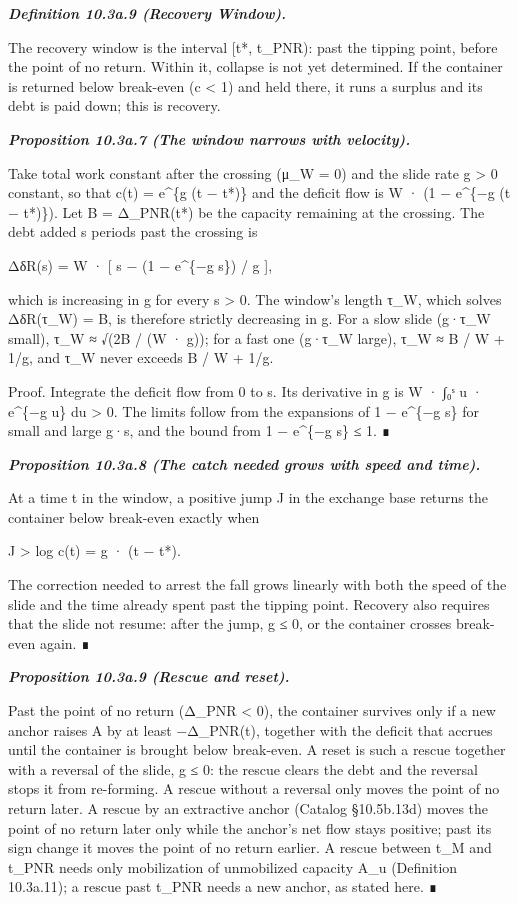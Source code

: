 \documentclass[
]{article}
\begin{document}
\emph{\textbf{Definition 10.3a.9 (Recovery Window).}}

The recovery window is the interval {[}t*, t\_PNR): past the tipping
point, before the point of no return. Within it, collapse is not yet
determined. If the container is returned below break-even (c \textless{}
1) and held there, it runs a surplus and its debt is paid down; this is
recovery.

\emph{\textbf{Proposition 10.3a.7 (The window narrows with velocity).}}

Take total work constant after the crossing (μ\_W = 0) and the slide
rate g \textgreater{} 0 constant, so that c(t) = e\^{}\{g (t − t*)\} and
the deficit flow is W · (1 − e\^{}\{−g (t − t*)\}). Let B = Δ\_PNR(t*)
be the capacity remaining at the crossing. The debt added s periods past
the crossing is

ΔδR(s) = W · {[} s − (1 − e\^{}\{−g s\}) / g {]},

which is increasing in g for every s \textgreater{} 0. The window's
length τ\_W, which solves ΔδR(τ\_W) = B, is therefore strictly
decreasing in g. For a slow slide (g·τ\_W small), τ\_W ≈ √(2B / (W ·
g)); for a fast one (g·τ\_W large), τ\_W ≈ B / W + 1/g, and τ\_W never
exceeds B / W + 1/g.

Proof. Integrate the deficit flow from 0 to s. Its derivative in g is W
· ∫₀ˢ u · e\^{}\{−g u\} du \textgreater{} 0. The limits follow from the
expansions of 1 − e\^{}\{−g s\} for small and large g·s, and the bound
from 1 − e\^{}\{−g s\} ≤ 1. ∎

\emph{\textbf{Proposition 10.3a.8 (The catch needed grows with speed and
time).}}

At a time t in the window, a positive jump J in the exchange base
returns the container below break-even exactly when

J \textgreater{} log c(t) = g · (t − t*).

The correction needed to arrest the fall grows linearly with both the
speed of the slide and the time already spent past the tipping point.
Recovery also requires that the slide not resume: after the jump, g ≤ 0,
or the container crosses break-even again. ∎

\emph{\textbf{Proposition 10.3a.9 (Rescue and reset).}}

Past the point of no return (Δ\_PNR \textless{} 0), the container
survives only if a new anchor raises A by at least −Δ\_PNR(t), together
with the deficit that accrues until the container is brought below
break-even. A reset is such a rescue together with a reversal of the
slide, g ≤ 0: the rescue clears the debt and the reversal stops it from
re-forming. A rescue without a reversal only moves the point of no
return later. A rescue by an extractive anchor (Catalog §10.5b.13d)
moves the point of no return later only while the anchor's net flow
stays positive; past its sign change it moves the point of no return
earlier. A rescue between t\_M and t\_PNR needs only mobilization of
unmobilized capacity A\_u (Definition 10.3a.11); a rescue past t\_PNR
needs a new anchor, as stated here. ∎
\end{document}
